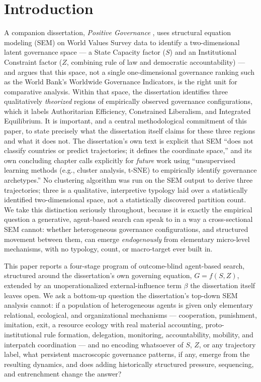 \section{Introduction}
\label{sec:introduction}

A companion dissertation, \textit{Positive Governance}
\parencite{yuenyong2025positive}, uses structural equation modeling (SEM)
on World Values Survey data to identify a two-dimensional latent governance
space --- a State Capacity factor ($S$) and an Institutional Constraint
factor ($Z$, combining rule of law and democratic accountability) --- and
argues that this space, not a single one-dimensional governance ranking
such as the World Bank's Worldwide Governance Indicators, is the right unit
for comparative analysis. Within that space, the dissertation identifies
three qualitatively \textit{theorized} regions of empirically observed
governance configurations, which it labels Authoritarian Efficiency,
Constrained Liberalism, and Integrated Equilibrium. It is important, and a
central methodological commitment of this paper, to state precisely what
the dissertation itself claims for these three regions and what it does
not. The dissertation's own text is explicit that SEM ``does not classify
countries or predict trajectories; it defines the coordinate space,'' and
its own concluding chapter calls explicitly for \textit{future} work using
``unsupervised learning methods (e.g., cluster analysis, t-SNE) to
empirically identify governance archetypes.'' No clustering algorithm was
run on the SEM output to derive three trajectories; three is a qualitative,
interpretive typology laid over a statistically identified two-dimensional
space, not a statistically discovered partition count. We take this
distinction seriously throughout, because it is exactly the empirical
question a generative, agent-based search can speak to in a way a
cross-sectional SEM cannot: whether heterogeneous governance configurations,
and structured movement between them, can emerge \textit{endogenously} from
elementary micro-level mechanisms, with no typology, count, or macro-target
ever built in.

This paper reports a four-stage program of outcome-blind agent-based
search, structured around the dissertation's own governing equation,
$G = f(S, Z)$, extended by an unoperationalized external-influence term
$\beta$ the dissertation itself leaves open. We ask a bottom-up question the
dissertation's top-down SEM analysis cannot: if a population of
heterogeneous agents is given only elementary relational, ecological, and
organizational mechanisms --- cooperation, punishment, imitation, exit, a
resource ecology with real material accounting, proto-institutional rule
formation, delegation, monitoring, accountability, mobility, and
interpatch coordination --- and no encoding whatsoever of $S$, $Z$, or any
trajectory label, what persistent macroscopic governance patterns, if any,
emerge from the resulting dynamics, and does adding historically structured
pressure, sequencing, and entrenchment change the answer?

